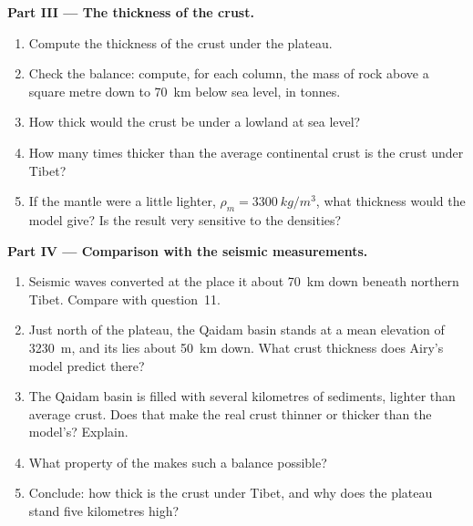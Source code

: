 \begin{problem}
\medskip
\noindent\textbf{Part III --- The thickness of the crust.}
\begin{enumerate}[resume]
  \item Compute the thickness of the crust under the plateau.
  \item Check the balance: compute, for each column, the mass of rock above
        a square metre down to \qty{70}{km} below sea level, in tonnes.
  \item How thick would the crust be under a lowland at sea level?
  \item How many times thicker than the average continental crust is the
        crust under Tibet?
  \item If the mantle were a little lighter, $\rho_m = \qty{3300}{kg/m^3}$,
        what thickness would the model give? Is the result very sensitive to
        the densities?
\end{enumerate}

\medskip
\noindent\textbf{Part IV --- Comparison with the seismic measurements.}
\begin{enumerate}[resume]
  \item Seismic waves converted at the  place it about \qty{70}{km} down
        beneath northern Tibet. Compare with question~11.
  \item Just north of the plateau, the Qaidam basin stands at a mean
        elevation of \qty{3230}{m}, and its  lies about \qty{50}{km}
        down. What crust thickness does Airy's model predict there?
  \item The Qaidam basin is filled with several kilometres of sediments,
        lighter than average crust. Does that make the real crust thinner or
        thicker than the model's? Explain.
  \item What property of the  makes such a balance possible?
  \item Conclude: how thick is the crust under Tibet, and why does the
        plateau stand five kilometres high?
\end{enumerate}
\end{problem}
